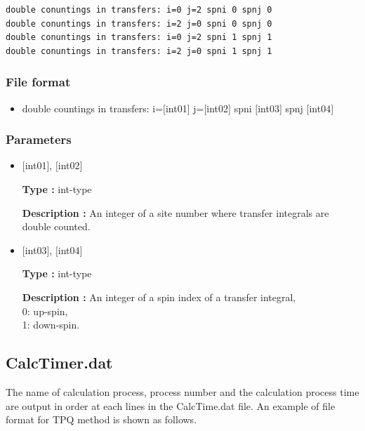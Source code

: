 \begin{minipage}{12.5cm}
\begin{screen}
\begin{verbatim}
double conuntings in transfers: i=0 j=2 spni 0 spnj 0  
double conuntings in transfers: i=2 j=0 spni 0 spnj 0  
double conuntings in transfers: i=0 j=2 spni 1 spnj 1  
double conuntings in transfers: i=2 j=0 spni 1 spnj 1  
\end{verbatim}
\end{screen}
\end{minipage}

\subsubsection{File format}
 \begin{itemize}
   \item  double countings in transfers: i=$[$int01$]$ j=$[$int02$]$ spni $[$int03$]$  spnj $[$int04$]$   
 \end{itemize}
 
\subsubsection{Parameters}
 \begin{itemize}

    \item  $[$int01$]$, $[$int02$]$
   
    {\bf Type :} int-type

   {\bf Description :} An integer of a site number where transfer integrals are double counted.
      
         \item  $[$int03$]$, $[$int04$]$  
   
    {\bf Type :} int-type

   {\bf Description :} An integer of a spin index of a transfer integral, \\
   0: up-spin,\\
   1: down-spin.\\ 
\end{itemize}

\newpage
\subsection{CalcTimer.dat}
The name of calculation process, process number and the calculation process time
are output in order at each lines in the CalcTime.dat file. An example of file format for TPQ method is shown as follows.\\

